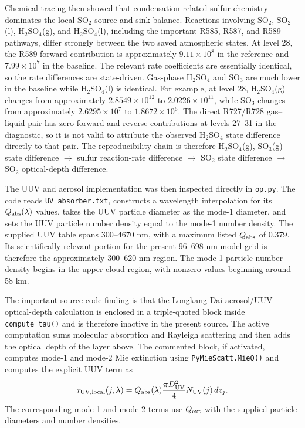 \documentclass[10pt]{article}
\begin{document}
Chemical tracing then showed that condensation-related sulfur chemistry dominates the local SO$_2$ source and sink balance. Reactions involving SO$_2$, SO$_2$(l), H$_2$SO$_4$(g), and H$_2$SO$_4$(l), including the important R585, R587, and R589 pathways, differ strongly between the two saved atmospheric states. At level 28, the R589 forward contribution is approximately $9.11\times10^8$ in the reference and $7.99\times10^7$ in the baseline. The relevant rate coefficients are essentially identical, so the rate differences are state-driven. Gas-phase H$_2$SO$_4$ and SO$_3$ are much lower in the baseline while H$_2$SO$_4$(l) is identical. For example, at level 28, H$_2$SO$_4$(g) changes from approximately $2.8549\times10^{12}$ to $2.0226\times10^{11}$, while SO$_3$ changes from approximately $2.6295\times10^7$ to $1.8672\times10^6$. The direct R727/R728 gas--liquid pair has zero forward and reverse contributions at levels 27--31 in the diagnostic, so it is not valid to attribute the observed H$_2$SO$_4$ state difference directly to that pair. The reproducibility chain is therefore H$_2$SO$_4$(g), SO$_3$(g) state difference $\rightarrow$ sulfur reaction-rate difference $\rightarrow$ SO$_2$ state difference $\rightarrow$ SO$_2$ optical-depth difference.

The UUV and aerosol implementation was then inspected directly in \texttt{op.py}. The code reads \texttt{UV\_absorber.txt}, constructs a wavelength interpolation for its $Q_{\rm abs}(\lambda)$ values, takes the UUV particle diameter as the mode-1 diameter, and sets the UUV particle number density equal to the mode-1 number density. The supplied UUV table spans 300--4670 nm, with a maximum listed $Q_{\rm abs}$ of 0.379. Its scientifically relevant portion for the present 96--698 nm model grid is therefore the approximately 300--620 nm region. The mode-1 particle number density begins in the upper cloud region, with nonzero values beginning around 58 km.

The important source-code finding is that the Longkang Dai aerosol/UUV optical-depth calculation is enclosed in a triple-quoted block inside \texttt{compute\_tau()} and is therefore inactive in the present source. The active computation sums molecular absorption and Rayleigh scattering and then adds the optical depth of the layer above. The commented block, if activated, computes mode-1 and mode-2 Mie extinction using \texttt{PyMieScatt.MieQ()} and computes the explicit UUV term as
\[
\tau_{\rm UV,local}(j,\lambda)
=
Q_{\rm abs}(\lambda)
\frac{\pi D_{\rm UV}^2}{4}
N_{\rm UV}(j)\,dz_j.
\]
The corresponding mode-1 and mode-2 terms use $Q_{\rm ext}$ with the supplied particle diameters and number densities.
\end{document}
